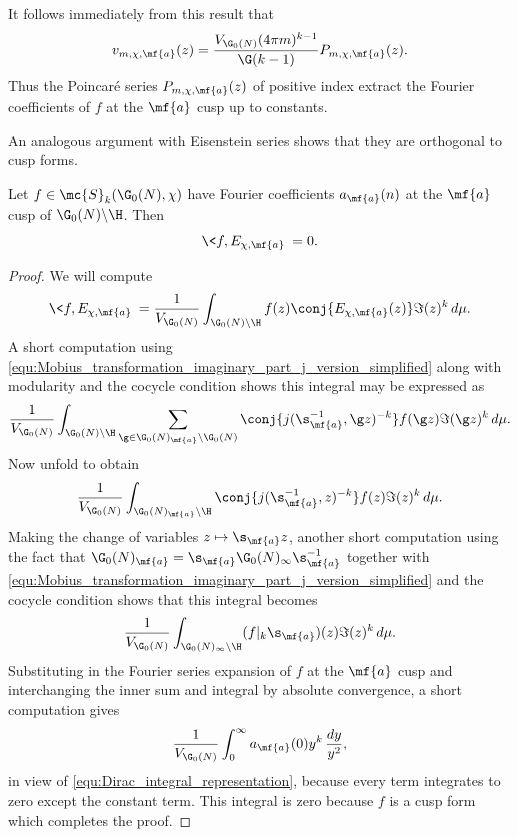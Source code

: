 \documentclass[12pt]{article}
\begin{document}
      It follows immediately from this result that
      \[
        v_{m,\chi,\mf{a}}(z) = \frac{V_{\G_{0}(N)}(4\pi m)^{k-1}}{\G(k-1)}P_{m,\chi,\mf{a}}(z).
      \]
      Thus the Poincar\'e series \(P_{m,\chi,\mf{a}}(z)\) of positive index extract the Fourier coefficients of \(f\) at the \(\mf{a}\) cusp up to constants.

      An analogous argument with Eisenstein series shows that they are orthogonal to cusp forms.
      
      \begin{proposition}\label{prop:Petersson_inner_product_with_Eisenstein_series}
        Let \(f \in \mc{S}_{k}(\G_{0}(N),\chi)\) have Fourier coefficients \(a_{\mf{a}}(n)\) at the \(\mf{a}\) cusp of \(\G_{0}(N)\backslash\H\). Then 
        \[
          \<f,E_{\chi,\mf{a}}\> = 0.
        \]
      \end{proposition}
      \begin{proof}
        We will compute 
        \[
          \<f,E_{\chi,\mf{a}}\> = \frac{1}{V_{\G_{0}(N)}}\int_{\G_{0}(N)\backslash\H}f(z)\conj{E_{\chi,\mf{a}}(z)}\Im(z)^{k}\,d\mu.
        \]
        A short computation using \cref{equ:Mobius_transformation_imaginary_part_j_version_simplified} along with modularity and the cocycle condition shows this integral may be expressed as
        \[
          \frac{1}{V_{\G_{0}(N)}}\int_{\G_{0}(N)\backslash\H}\sum_{\g \in \G_{0}(N)_{\mf{a}}\backslash\G_{0}(N)}\conj{j(\s_{\mf{a}}^{-1},\g z)^{-k}}f(\g z)\Im(\g z)^{k}\,d\mu.
        \]
        Now unfold to obtain
        \[
          \frac{1}{V_{\G_{0}(N)}}\int_{\G_{0}(N)_{\mf{a}}\backslash\H}\conj{j(\s_{\mf{a}}^{-1},z)^{-k}}f(z)\Im(z)^{k}\,d\mu.
        \]
        Making the change of variables \(z \mapsto \s_{\mf{a}}z\), another short computation using the fact that \(\G_{0}(N)_{\mf{a}} = \s_{\mf{a}}\G_{0}(N)_{\infty}\s_{\mf{a}}^{-1}\) together with \cref{equ:Mobius_transformation_imaginary_part_j_version_simplified} and the cocycle condition shows that this integral becomes
        \[
          \frac{1}{V_{\G_{0}(N)}}\int_{\G_{0}(N)_{\infty}\backslash\H}(f|_{k}\s_{\mf{a}})(z)\Im(z)^{k}\,d\mu.
        \]
        Substituting in the Fourier series expansion of \(f\) at the \(\mf{a}\) cusp and interchanging the inner sum and integral by absolute convergence, a short computation gives
        \[
          \frac{1}{V_{\G_{0}(N)}}\int_{0}^{\infty}a_{\mf{a}}(0)y^{k}\,\frac{dy}{y^{2}},
        \]
        in view of \cref{equ:Dirac_integral_representation}, because every term integrates to zero except the constant term. This integral is zero because \(f\) is a cusp form which completes the proof. 
      \end{proof}
\end{document}
